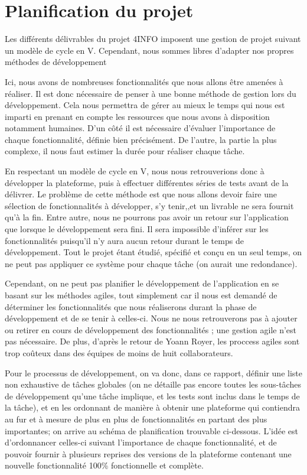 \section{Planification du projet}
\label{sec:orga}

	Les différents délivrables du projet 4INFO imposent une gestion de projet suivant un modèle de cycle en V. Cependant, nous sommes libres d'adapter nos propres méthodes de développement 

	Ici, nous avons de nombreuses fonctionnalités que nous allons être amenées à réaliser. Il est donc nécessaire de penser à une bonne méthode de gestion lors du développement. Cela nous permettra de gérer au mieux le temps qui nous est imparti en prenant en compte les ressources que nous avons à disposition notamment humaines. D'un côté il est nécessaire d'évaluer l'importance de chaque fonctionnalité, définie bien précisément. De l'autre, la partie la plus complexe, il nous faut estimer la durée pour réaliser chaque tâche.

	En respectant un modèle de cycle en V, nous nous retrouverions donc à développer la plateforme, puis à effectuer différentes séries de tests avant de la délivrer. Le problème de cette méthode est que nous allons devoir faire une sélection de fonctionnalités à développer, s'y tenir,,et un livrable ne sera fournit qu'à la fin. Entre autre, nous ne pourrons pas avoir un retour sur l'application que lorsque le développement sera fini. Il sera impossible d'inférer sur les fonctionnalités puisqu'il n'y aura aucun retour durant le temps de développement. Tout le projet étant étudié, spécifié et conçu en un seul temps, on ne peut pas appliquer ce système pour chaque tâche (on aurait une redondance).

	Cependant, on ne peut pas planifier le développement de l'application en se basant sur les méthodes agiles, tout simplement car il nous est demandé de déterminer les fonctionnalités que nous réaliserons durant la phase de développement et de se tenir à celles-ci. Nous ne nous retrouverons pas à ajouter ou retirer en cours de développement des fonctionnalités ; une gestion agile n'est pas nécessaire. De plus, d'après le retour de Yoann Royer, les proccess agiles sont trop coûteux dans des équipes de moins de huit collaborateurs.

	Pour le processus de développement, on va donc, dans ce rapport, définir une liste non exhaustive de tâches globales (on ne détaille pas encore toutes les sous-tâches de développement qu'une tâche implique, et les tests sont inclus dans le temps de la tâche), et en les ordonnant de manière à obtenir une plateforme qui contiendra au fur et à mesure de plus en plus de fonctionnalités en partant des plus importantes; on arrive au schéma de planification trouvable ci-dessous. L'idée est d'ordonnancer celles-ci suivant l'importance de chaque fonctionnalité, et de pouvoir fournir à plusieurs reprises des versions de la plateforme contenant une nouvelle fonctionnalité 100\% fonctionnelle et complète.

